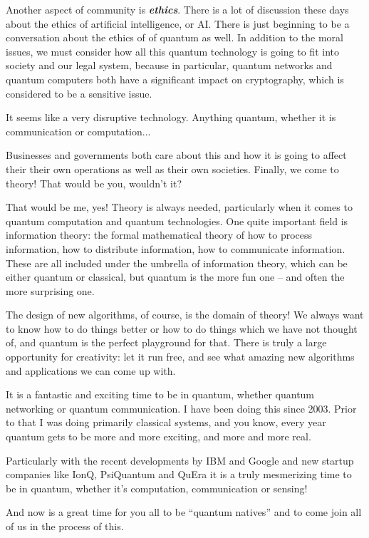 Another aspect of community is \textbf{\emph{ethics}}. There is a lot of discussion these days about the ethics of artificial intelligence, or AI. There is just beginning to be a conversation about the ethics of of quantum as well. In addition to the moral issues, we must consider how all this quantum technology is going to fit into society and our legal system, because in particular, quantum networks and quantum computers both have a significant impact on cryptography, which is considered to be a sensitive issue.

\mmm It seems like a very disruptive technology.  Anything quantum, whether it is communication or computation...

\rrr Businesses and governments both care about this and how it is going to affect their their own operations as well as their own societies.
Finally, we come to theory! That would be you, wouldn't it?

\mmm That would be me, yes! Theory is always needed, particularly when it comes to quantum computation and quantum technologies. One quite important field is information theory: the formal mathematical theory of how to process information, how to distribute information, how to communicate information. These are all included under the umbrella of information theory, which can be either quantum or classical, but quantum is the more fun one -- and often the more surprising one.

The design of new algorithms, of course, is the domain of theory! We always want to know how to do things better or how to do things which we have not thought of, and quantum is the perfect playground for that. There is truly a large opportunity for creativity: let it run free, and see what amazing new algorithms and applications we can come up with.

\rrr It is a fantastic and exciting time to be in quantum, whether quantum networking or quantum communication. I have been doing this since 2003. Prior to that I was doing primarily classical systems, and you know, every year quantum gets to be more and more exciting, and more and more real.

\mmm Particularly with the recent developments by IBM and Google and new startup companies like IonQ, PsiQuantum and QuEra it is a truly mesmerizing time to be in quantum, whether it's computation, communication or sensing!

\rrr And now is a great time for you all to be ``quantum natives'' and to come join all of us in the process of this.

